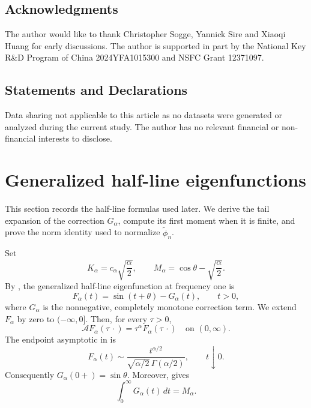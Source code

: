 \documentclass[11pt]{amsart}
\numberwithin{equation}{section}
\theoremstyle{remark}
\newcommand{\wt}{\widetilde}
\begin{document}
\subsection{Acknowledgments}
The author would like to thank Christopher  Sogge, Yannick Sire and Xiaoqi Huang for early discussions. The author is supported in part by the National Key R\&D Program of China
2024YFA1015300 and NSFC Grant 12371097.
\subsection{Statements and Declarations}
Data sharing not applicable to this article as no datasets were generated or analyzed during the current study. The author has no relevant financial or non-financial interests to disclose.
\section{Generalized half-line eigenfunctions}
\label{sec:halfline}

This section records the half-line formulas used later.  We derive the tail
expansion of the correction $G_\alpha$, compute its first moment when it is finite,
and prove the norm identity used to normalize $\wt\phi_n$.

Set
\[
 K_\alpha=c_\alpha\sqrt{\frac{\alpha}{2}},
 \qquad
 M_\alpha=\cos\theta-\sqrt{\frac{\alpha}{2}}.
\]
By \cite[Theorem~1.1 and Example~6.1]{KwasnickiHalfLine}, the generalized
half-line eigenfunction at frequency one is
\begin{equation}\label{eq:F}
 F_\alpha(t)=\sin(t+\theta)-G_\alpha(t),\qquad t>0,
\end{equation}
where $G_\alpha$ is the nonnegative, completely monotone correction term.  We extend
$F_\alpha$ by zero to $(-\infty,0]$.  Then, for every $\tau>0$,
\begin{equation}\label{half}
 \mathcal A F_\alpha(\tau\,\cdot)=\tau^\alpha F_\alpha(\tau\,\cdot)
 \quad\text{on }(0,\infty).
\end{equation}
The endpoint asymptotic in
\cite[Example~6.1 and Lemma~4.27]{KwasnickiHalfLine} is
\begin{equation}\label{eq:F-zero}
 F_\alpha(t)\sim
 \frac{t^{\alpha/2}}
 {\sqrt{\alpha/2}\,\Gamma(\alpha/2)},
 \qquad t\downarrow0.
\end{equation}
Consequently $G_\alpha(0+)=\sin\theta$.  Moreover,
\cite[Lemma~4.21]{KwasnickiHalfLine} gives
\begin{equation}\label{eq:Gmass}
 \int_0^\infty G_\alpha(t)\,dt=M_\alpha.
\end{equation}
\end{document}
